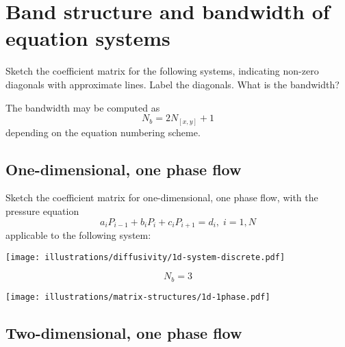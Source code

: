 
\section{Band structure and bandwidth of equation systems} %
\label{sec:band_structure_and_bandwidth_of_equation_systems}

\begin{question}
  Sketch the coefficient matrix for the following systems, indicating non-zero diagonals with
approximate lines. Label the diagonals. What is the bandwidth?
\end{question}

The bandwidth may be computed as
\begin{equation}
  N_b = 2N_{[x,y]}+1
\end{equation}
depending on the equation numbering scheme.

\subsection{One-dimensional, one phase flow} %
\label{sub:one_dimensional_}

\begin{question}
  Sketch the coefficient matrix for one-dimensional, one phase flow, with the pressure equation
  \begin{equation}
    \nonumber
    a_i P_{i-1} + b_i P_i + c_i P_{i+1} = d_i, \; i=1,N
  \end{equation}
  applicable to the following system:

  \begin{center}
    \texttt{[image: illustrations/diffusivity/1d-system-discrete.pdf]}
  \end{center}
\end{question}

\begin{equation}
  N_b = 3 \nonumber
\end{equation}

\begin{center}
  \texttt{[image: illustrations/matrix-structures/1d-1phase.pdf]}
\end{center}




\subsection{Two-dimensional, one phase flow} %
\label{sub:two_dimensional_one_phase_flow}

